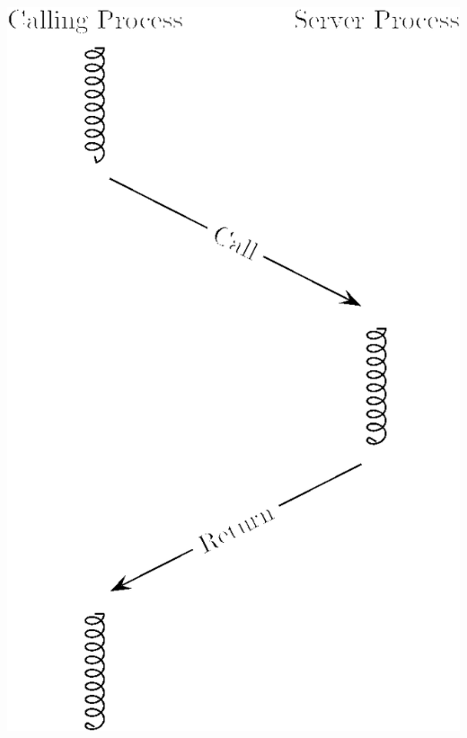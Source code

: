 \documentclass{article}
\begin{document}
\includegraphics[scale=0.4]{figures/rpc.png}\hfill
\end{document}
